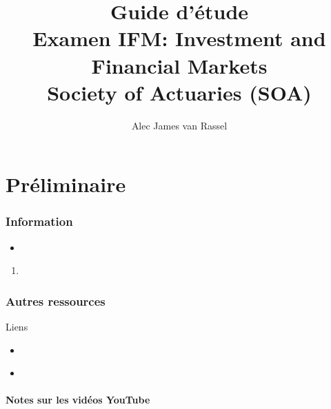 \documentclass[12pt, titlepage, french]{report}
\title{
	Guide d'étude	\\
	\large Examen IFM: Investment and Financial Markets\\
	Society of Actuaries (SOA)}
\date{}
\author{Alec James van Rassel}
\begin{document}
\maketitle

\tableofcontents

\clearpage

\part*{Préliminaire}

\section{Information}

\begin{distributions}[Objectives]
\begin{itemize}
	\item	
\end{itemize}
\end{distributions}

\begin{outcomes}
\begin{enumerate}
	\item	
\end{enumerate}
\end{outcomes}

\clearpage

\section{Autres ressources}
\begin{FORMULA_SUMM}{Liens}
\begin{itemize}
	\item	
\end{itemize}
\end{FORMULA_SUMM}

\begin{YTB_vids}
\begin{itemize}
	\item	
\end{itemize}
\end{YTB_vids}

\subsection{Notes sur les vidéos YouTube}

%
\end{document}
